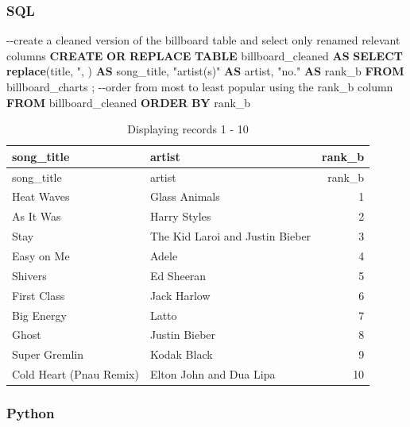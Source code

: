 \documentclass[
  letterpaper,
  DIV=11,
  numbers=noendperiod]{scrreprt}
\newenvironment{Shaded}{\begin{snugshade}}{\end{snugshade}}
\newcommand{\CommentTok}[1]{\textcolor[rgb]{0.37,0.37,0.37}{#1}}
\newcommand{\KeywordTok}[1]{\textcolor[rgb]{0.00,0.23,0.31}{\textbf{#1}}}
\newcommand{\NormalTok}[1]{\textcolor[rgb]{0.00,0.23,0.31}{#1}}
\newcommand{\OtherTok}[1]{\textcolor[rgb]{0.00,0.23,0.31}{#1}}
\newcommand{\StringTok}[1]{\textcolor[rgb]{0.13,0.47,0.30}{#1}}
\begin{document}
\subsubsection{SQL}

\begin{Shaded}
\begin{Highlighting}[]
\CommentTok{{-}{-}create a cleaned version of the billboard table and select only renamed relevant columns}
\KeywordTok{CREATE} \KeywordTok{OR} \KeywordTok{REPLACE} \KeywordTok{TABLE}\NormalTok{ billboard\_cleaned }\KeywordTok{AS}
  \KeywordTok{SELECT} \KeywordTok{replace}\NormalTok{(title, }\StringTok{\textquotesingle{}"\textquotesingle{}}\NormalTok{, }\StringTok{\textquotesingle{}\textquotesingle{}}\NormalTok{) }\KeywordTok{AS}\NormalTok{ song\_title, }\OtherTok{"artist(s)"} \KeywordTok{AS}\NormalTok{ artist, }\OtherTok{"no."} \KeywordTok{AS}\NormalTok{ rank\_b}
  \KeywordTok{FROM}\NormalTok{ billboard\_charts}
\NormalTok{;}
\CommentTok{{-}{-}order from most to least popular using the rank\_b column}
\KeywordTok{FROM}\NormalTok{ billboard\_cleaned}
\KeywordTok{ORDER} \KeywordTok{BY}\NormalTok{ rank\_b}
\end{Highlighting}
\end{Shaded}

\begin{longtable}[]{@{}llr@{}}
\caption{Displaying records 1 - 10}\tabularnewline
\toprule\noalign{}
song\_title & artist & rank\_b \\
\midrule\noalign{}
\endfirsthead
\toprule\noalign{}
song\_title & artist & rank\_b \\
\midrule\noalign{}
\endhead
\bottomrule\noalign{}
\endlastfoot
Heat Waves & Glass Animals & 1 \\
As It Was & Harry Styles & 2 \\
Stay & The Kid Laroi and Justin Bieber & 3 \\
Easy on Me & Adele & 4 \\
Shivers & Ed Sheeran & 5 \\
First Class & Jack Harlow & 6 \\
Big Energy & Latto & 7 \\
Ghost & Justin Bieber & 8 \\
Super Gremlin & Kodak Black & 9 \\
Cold Heart (Pnau Remix) & Elton John and Dua Lipa & 10 \\
\end{longtable}

\subsubsection{Python}
\end{document}
